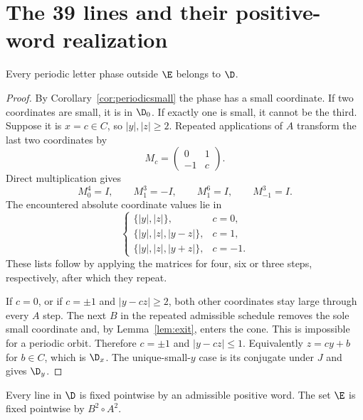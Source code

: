 \section{The 39 lines and their positive-word realization}\label{sec:locus}

\begin{proposition}\label{prop:cover}
Every periodic letter phase outside $\E$ belongs to $\D$.
\end{proposition}

\begin{proof}
By Corollary~\ref{cor:periodicsmall} the phase has a small
coordinate. If two coordinates are small, it is in $\D_0$.
If exactly one is small, it cannot be the third. Suppose
it is $x=c\in C$, so $|y|,|z|\ge2$. Repeated applications
of $A$ transform the last two coordinates by
\[
 M_c=\begin{pmatrix}0&1\\-1&c\end{pmatrix}.
\]
Direct multiplication gives
\begin{equation}\label{eq:rotations}
 M_0^4=I,\qquad M_1^3=-I,\qquad M_1^6=I,\qquad
 M_{-1}^3=I.
\end{equation}
The encountered absolute coordinate values lie in
\[
 \begin{cases}
 \{|y|,|z|\},&c=0,\\
 \{|y|,|z|,|y-z|\},&c=1,\\
 \{|y|,|z|,|y+z|\},&c=-1.
 \end{cases}
\]
These lists follow by applying the matrices for four, six
or three steps, respectively, after which they repeat.

If $c=0$, or if $c=\pm1$ and $|y-cz|\ge2$, both other
coordinates stay large through every $A$ step. The next
$B$ in the repeated admissible schedule removes the sole
small coordinate and, by Lemma~\ref{lem:exit}, enters the
cone. This is impossible for a periodic orbit. Therefore
$c=\pm1$ and $|y-cz|\le1$. Equivalently
$z=cy+b$ for $b\in C$, which is $\D_x$. The unique-small-$y$
case is its conjugate under $J$ and gives $\D_y$.
\end{proof}

\begin{proposition}\label{prop:realize}
Every line in $\D$ is fixed pointwise by an admissible positive
word. The set $\E$ is fixed pointwise by $B^2\circ A^2$.
\end{proposition}

